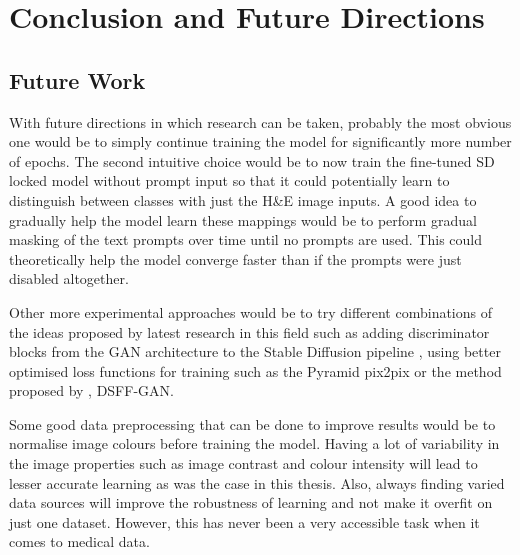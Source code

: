 
\chapter{Conclusion and Future Directions } %



\ifpdf
    \graphicspath{{6_conclusions/figures/PNG/}{6_conclusions/figures/PDF/}{6_conclusions/figures/}}
\else
    \graphicspath{{6_conclusions/figures/EPS/}{6_conclusions/figures/}}
\fi



\section{Future Work}

With future directions in which research can be taken, probably the most obvious one would be to simply continue training the model for significantly more number of epochs. The second intuitive choice would be to now train the fine-tuned SD locked model without prompt input so that it could potentially learn to distinguish between classes with just the H\&E image inputs. A good idea to gradually help the model learn these mappings would be to perform gradual masking of the text prompts over time until no prompts are used. This could theoretically help the model converge faster than if the prompts were just disabled altogether. 

Other more experimental approaches would be to try different combinations of the ideas proposed by latest research in this field such as adding discriminator blocks from the GAN architecture to the Stable Diffusion pipeline \parencite{Wang2022Diffusion-GAN:Diffusion}, using better optimised loss functions for training such as the Pyramid pix2pix \parencite{Liu2022BCI:Pix2pix}
or the method proposed by \textcite{Ma2024DSFF-GAN:Cancer}, DSFF-GAN.

Some good data preprocessing that can be done to improve results would be to normalise image colours before training the model. Having a lot of variability in the image properties such as image contrast and colour intensity will lead to lesser accurate learning as was the case in this thesis. Also, always finding varied data sources will improve the robustness of learning and not make it overfit on just one dataset. However, this has never been a very accessible task when it comes to medical data.

